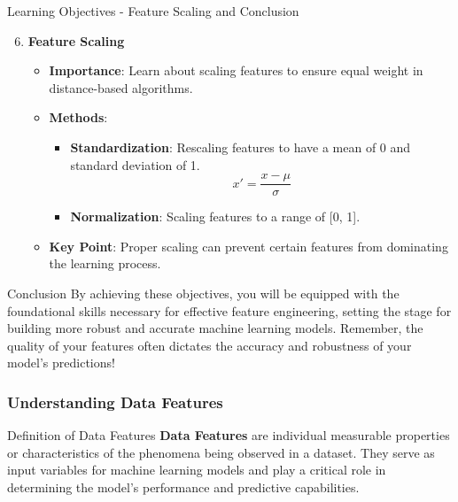 \documentclass[aspectratio=169]{beamer}
\begin{document}
\begin{frame}[fragile]{Learning Objectives - Feature Scaling and Conclusion}
    \begin{enumerate}
        \setcounter{enumi}{5}
        \item \textbf{Feature Scaling}
            \begin{itemize}
                \item \textbf{Importance}: Learn about scaling features to ensure equal weight in distance-based algorithms.
                \item \textbf{Methods}:
                    \begin{itemize}
                        \item \textbf{Standardization}: Rescaling features to have a mean of 0 and standard deviation of 1.
                            \begin{equation}
                            x' = \frac{x - \mu}{\sigma}
                            \end{equation}
                        \item \textbf{Normalization}: Scaling features to a range of [0, 1].
                    \end{itemize}
                \item \textbf{Key Point}: Proper scaling can prevent certain features from dominating the learning process.
            \end{itemize}
    \end{enumerate}

    \begin{block}{Conclusion}
        By achieving these objectives, you will be equipped with the foundational skills necessary for effective feature engineering, setting the stage for building more robust and accurate machine learning models. Remember, the quality of your features often dictates the accuracy and robustness of your model’s predictions!
    \end{block}
\end{frame}

\begin{frame}[fragile]
    \frametitle{Understanding Data Features}
    \begin{block}{Definition of Data Features}
        \textbf{Data Features} are individual measurable properties or characteristics of the phenomena being observed in a dataset. 
        They serve as input variables for machine learning models and play a critical role in determining the model’s performance and predictive capabilities.
    \end{block}
\end{frame}
\end{document}
